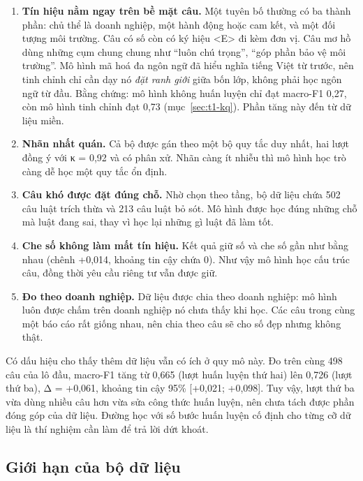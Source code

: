 \begin{enumerate}
\item \textbf{Tín hiệu nằm ngay trên bề mặt câu.} Một tuyên bố thường có ba thành phần: chủ thể là doanh nghiệp, một hành động hoặc cam kết, và một đối tượng môi trường. Câu có số còn có ký hiệu \textless E\textgreater{} đi kèm đơn vị. Câu mơ hồ dùng những cụm chung chung như “luôn chú trọng”, “góp phần bảo vệ môi trường”. Mô hình mã hoá đa ngôn ngữ đã hiểu nghĩa tiếng Việt từ trước, nên tinh chỉnh chỉ cần dạy nó \emph{đặt ranh giới} giữa bốn lớp, không phải học ngôn ngữ từ đầu. Bằng chứng: mô hình không huấn luyện chỉ đạt macro-F1 0,27, còn mô hình tinh chỉnh đạt 0,73 (mục~\ref{sec:t1-kq}). Phần tăng này đến từ dữ liệu miền.
\item \textbf{Nhãn nhất quán.} Cả bộ được gán theo một bộ quy tắc duy nhất, hai lượt đồng ý với κ = 0,92 và có phân xử. Nhãn càng ít nhiễu thì mô hình học trò càng dễ học một quy tắc ổn định.
\item \textbf{Câu khó được đặt đúng chỗ.} Nhờ chọn theo tầng, bộ dữ liệu chứa 502 câu luật trích thừa và 213 câu luật bỏ sót. Mô hình được học đúng những chỗ mà luật đang sai, thay vì học lại những gì luật đã làm tốt.
\item \textbf{Che số không làm mất tín hiệu.} Kết quả giữ số và che số gần như bằng nhau (chênh +0,014, khoảng tin cậy chứa 0). Như vậy mô hình học cấu trúc câu, đồng thời yêu cầu riêng tư vẫn được giữ.
\item \textbf{Đo theo doanh nghiệp.} Dữ liệu được chia theo doanh nghiệp: mô hình luôn được chấm trên doanh nghiệp nó chưa thấy khi học. Các câu trong cùng một báo cáo rất giống nhau, nên chia theo câu sẽ cho số đẹp nhưng không thật.
\end{enumerate}

Có dấu hiệu cho thấy thêm dữ liệu vẫn có ích ở quy mô này. Đo trên cùng 498 câu của lô đầu, macro-F1 tăng từ 0,665 (lượt huấn luyện thứ hai) lên 0,726 (lượt thứ ba), Δ = +0,061, khoảng tin cậy 95\% [+0,021; +0,098]. Tuy vậy, lượt thứ ba vừa dùng nhiều câu hơn vừa sửa công thức huấn luyện, nên chưa tách được phần đóng góp của dữ liệu. Đường học với số bước huấn luyện cố định cho từng cỡ dữ liệu là thí nghiệm cần làm để trả lời dứt khoát.

\subsection{Giới hạn của bộ dữ liệu}

